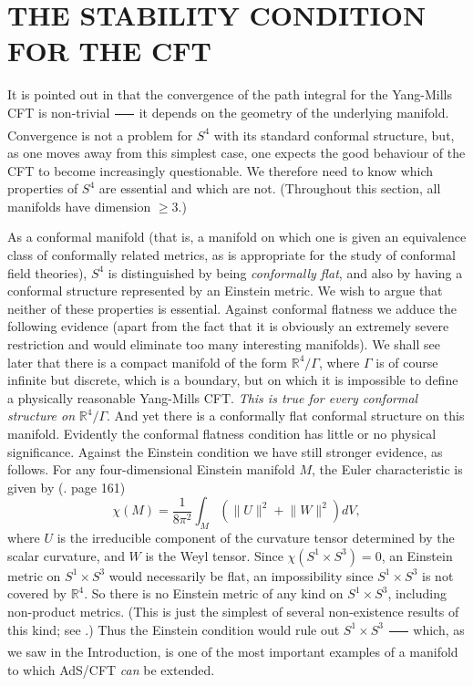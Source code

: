 \documentclass[a4paper,12pt]{article}
\newcommand{\field}[1]{\mathbb{#1}}
\newcommand{\R}{\field{R}}
\newcommand{\norm}[1]{\lVert#1\rVert}
\theoremstyle{definition}
\renewcommand{\u}{\textit}
\renewcommand{\-}{$\dfrac{\quad\enspace}{\quad}$}
\begin{document}
\section{\large THE STABILITY CONDITION FOR THE CFT}

It is pointed out in \cite{3} that the convergence of the path integral for the Yang-Mills CFT is non-trivial \- it depends on the geometry of the underlying manifold. Convergence is not a problem for $S^4$ with its standard conformal structure, but, as one moves away from this simplest case, one expects the good behaviour of the CFT to become increasingly questionable. We therefore need to know which properties of $S^4$ are essential and which are not. (Throughout this section, all manifolds have dimension $\geq 3$.)

As a conformal manifold (that is, a manifold on which one is given an equivalence class of conformally related metrics, as is appropriate for the study of conformal field theories), $S^4$ is distinguished by being \u{conformally flat}, and also by having a conformal structure represented by an Einstein metric. We wish to argue that neither of these properties is essential. Against conformal flatness we adduce the following evidence (apart from the fact that it is obviously an extremely severe restriction and would eliminate too many interesting manifolds). We shall see later that there is a compact manifold of the form $\R^4/\Gamma$, where $\Gamma$ is of course infinite but discrete, which is a boundary, but on which it is impossible to define a physically reasonable Yang-Mills CFT. \u{This is true for every conformal structure on} $\R^4/\Gamma$. And yet there is a conformally flat conformal structure on this manifold. Evidently the conformal flatness condition has little or no physical significance. Against the Einstein condition we have still stronger evidence, as follows. For any four-dimensional Einstein manifold $M$, the Euler characteristic is given by (\cite{8}. page 161)
\begin{equation}
\chi(M)=\dfrac{1}{8\pi^2}\int_M(\norm{U}^2+\norm{W}^2) dV,
\end{equation} 
where $U$ is the irreducible component of the curvature tensor determined by the scalar curvature, and $W$ is the Weyl tensor. Since $\chi(S^1\times S^3)=0$, an Einstein metric on $S^1\times S^3$ would necessarily be flat, an impossibility since $S^1\times S^3$ is not covered by $\R^4$. So there is no Einstein metric of any kind on $S^1\times S^3$, including non-product metrics. (This is just the simplest of several non-existence results of this kind; see \cite{9}.) Thus the Einstein condition would rule out $S^1\times S^3$ \- which, as we saw in the Introduction, is one of the most important examples of a manifold to which AdS/CFT \u{can} be extended.
\end{document}
